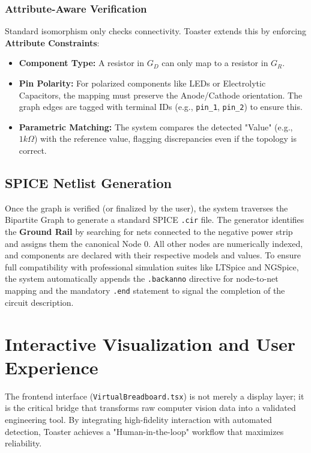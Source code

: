 \documentclass[11pt,a4paper]{article}
\begin{document}
\subsubsection{Attribute-Aware Verification}
Standard isomorphism only checks connectivity. Toaster extends this by enforcing \textbf{Attribute Constraints}:
\begin{itemize}
    \item \textbf{Component Type:} A resistor in $G_D$ can only map to a resistor in $G_R$.
    \item \textbf{Pin Polarity:} For polarized components like LEDs or Electrolytic Capacitors, the mapping must preserve the Anode/Cathode orientation. The graph edges are tagged with terminal IDs (e.g., \texttt{pin\_1}, \texttt{pin\_2}) to ensure this.
    \item \textbf{Parametric Matching:} The system compares the detected "Value" (e.g., $1k\Omega$) with the reference value, flagging discrepancies even if the topology is correct.
\end{itemize}

\subsection{SPICE Netlist Generation}
Once the graph is verified (or finalized by the user), the system traverses the Bipartite Graph to generate a standard SPICE \texttt{.cir} file. The generator identifies the \textbf{Ground Rail} by searching for nets connected to the negative power strip and assigns them the canonical Node 0. All other nodes are numerically indexed, and components are declared with their respective models and values. To ensure full compatibility with professional simulation suites like LTSpice and NGSpice, the system automatically appends the \texttt{.backanno} directive for node-to-net mapping and the mandatory \texttt{.end} statement to signal the completion of the circuit description.

\section{Interactive Visualization and User Experience}
The frontend interface (\texttt{VirtualBreadboard.tsx}) is not merely a display layer; it is the critical bridge that transforms raw computer vision data into a validated engineering tool. By integrating high-fidelity interaction with automated detection, Toaster achieves a "Human-in-the-loop" workflow that maximizes reliability.
\end{document}
